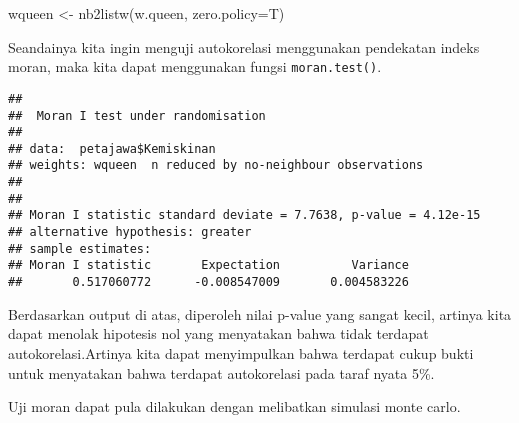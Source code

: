 \documentclass[
]{book}
\newenvironment{Shaded}{\begin{snugshade}}{\end{snugshade}}
\newcommand{\AttributeTok}[1]{\textcolor[rgb]{0.77,0.63,0.00}{#1}}
\newcommand{\CommentTok}[1]{\textcolor[rgb]{0.56,0.35,0.01}{\textit{#1}}}
\newcommand{\DecValTok}[1]{\textcolor[rgb]{0.00,0.00,0.81}{#1}}
\newcommand{\FunctionTok}[1]{\textcolor[rgb]{0.00,0.00,0.00}{#1}}
\newcommand{\NormalTok}[1]{#1}
\newcommand{\OtherTok}[1]{\textcolor[rgb]{0.56,0.35,0.01}{#1}}
\newcommand{\SpecialCharTok}[1]{\textcolor[rgb]{0.00,0.00,0.00}{#1}}
\newcommand{\StringTok}[1]{\textcolor[rgb]{0.31,0.60,0.02}{#1}}
\begin{document}
\begin{Shaded}
\begin{Highlighting}[]
\NormalTok{wqueen }\OtherTok{\textless{}{-}} \FunctionTok{nb2listw}\NormalTok{(w.queen, }\AttributeTok{zero.policy=}\NormalTok{T)}
\end{Highlighting}
\end{Shaded}

Seandainya kita ingin menguji autokorelasi menggunakan pendekatan indeks moran, maka kita dapat menggunakan fungsi \texttt{moran.test()}.

\begin{Shaded}
\end{Shaded}

\begin{verbatim}
## 
##  Moran I test under randomisation
## 
## data:  petajawa$Kemiskinan  
## weights: wqueen  n reduced by no-neighbour observations
##   
## 
## Moran I statistic standard deviate = 7.7638, p-value = 4.12e-15
## alternative hypothesis: greater
## sample estimates:
## Moran I statistic       Expectation          Variance 
##       0.517060772      -0.008547009       0.004583226
\end{verbatim}

Berdasarkan output di atas, diperoleh nilai p-value yang sangat kecil, artinya kita dapat menolak hipotesis nol yang menyatakan bahwa tidak terdapat autokorelasi.Artinya kita dapat menyimpulkan bahwa terdapat cukup bukti untuk menyatakan bahwa terdapat autokorelasi pada taraf nyata 5\%.

Uji moran dapat pula dilakukan dengan melibatkan simulasi monte carlo.

\begin{Shaded}
\end{Shaded}
\end{document}
